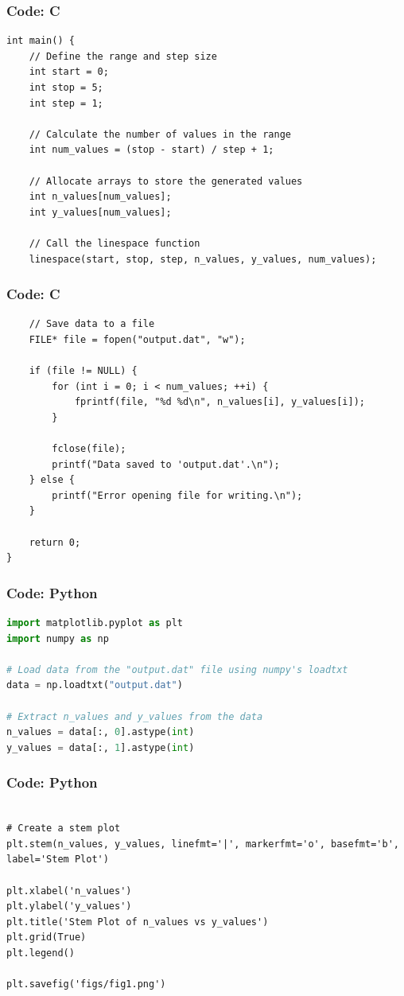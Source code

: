 \documentclass{beamer}
\begin{document}
\begin{frame}[fragile]
\frametitle{Code: C}
\begin{lstlisting}
int main() {
    // Define the range and step size
    int start = 0;
    int stop = 5;
    int step = 1;

    // Calculate the number of values in the range
    int num_values = (stop - start) / step + 1;

    // Allocate arrays to store the generated values
    int n_values[num_values];
    int y_values[num_values];

    // Call the linespace function
    linespace(start, stop, step, n_values, y_values, num_values);
\end{lstlisting}
\end{frame}

\begin{frame}[fragile]
\frametitle{Code: C}
\begin{lstlisting}
    // Save data to a file
    FILE* file = fopen("output.dat", "w");

    if (file != NULL) {
        for (int i = 0; i < num_values; ++i) {
            fprintf(file, "%d %d\n", n_values[i], y_values[i]);
        }

        fclose(file);
        printf("Data saved to 'output.dat'.\n");
    } else {
        printf("Error opening file for writing.\n");
    }

    return 0;
}
\end{lstlisting}
\end{frame}

\begin{frame}[fragile]
\frametitle{Code: Python}
\begin{lstlisting}[language=Python, basicstyle=\small\ttfamily, breaklines=true, frame=single]
import matplotlib.pyplot as plt
import numpy as np

# Load data from the "output.dat" file using numpy's loadtxt
data = np.loadtxt("output.dat")

# Extract n_values and y_values from the data
n_values = data[:, 0].astype(int)
y_values = data[:, 1].astype(int)

\end{lstlisting}
\end{frame}
\begin{frame}[fragile]
\frametitle{Code: Python}
\begin{lstlisting}

# Create a stem plot
plt.stem(n_values, y_values, linefmt='|', markerfmt='o', basefmt='b', label='Stem Plot')

plt.xlabel('n_values')
plt.ylabel('y_values')
plt.title('Stem Plot of n_values vs y_values')
plt.grid(True)
plt.legend()

plt.savefig('figs/fig1.png')
\end{lstlisting}
\end{frame}
\end{document}
